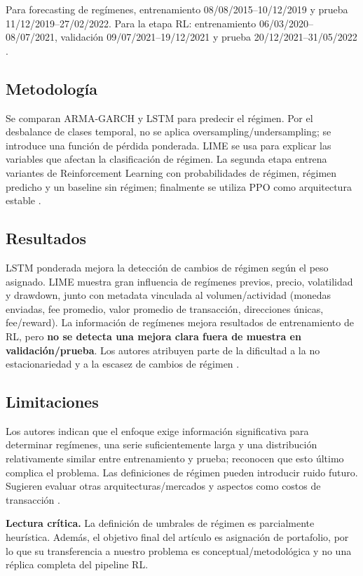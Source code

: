 \documentclass[11pt,letterpaper]{article}
\newcommand{\critica}[1]{\par\smallskip\noindent\textbf{Lectura crítica.} #1}
\begin{document}
Para forecasting de regímenes, entrenamiento 08/08/2015--10/12/2019 y prueba 11/12/2019--27/02/2022. Para la etapa RL: entrenamiento 06/03/2020--08/07/2021, validación 09/07/2021--19/12/2021 y prueba 20/12/2021--31/05/2022 \parencite{agakishiev2025}.

\subsection{Metodología}
Se comparan ARMA-GARCH y LSTM para predecir el régimen. Por el desbalance de clases temporal, no se aplica oversampling/undersampling; se introduce una función de pérdida ponderada. LIME se usa para explicar las variables que afectan la clasificación de régimen. La segunda etapa entrena variantes de Reinforcement Learning con probabilidades de régimen, régimen predicho y un baseline sin régimen; finalmente se utiliza PPO como arquitectura estable \parencite{agakishiev2025}.

\subsection{Resultados}
LSTM ponderada mejora la detección de cambios de régimen según el peso asignado. LIME muestra gran influencia de regímenes previos, precio, volatilidad y drawdown, junto con metadata vinculada al volumen/actividad (monedas enviadas, fee promedio, valor promedio de transacción, direcciones únicas, fee/reward). La información de regímenes mejora resultados de entrenamiento de RL, pero \textbf{no se detecta una mejora clara fuera de muestra en validación/prueba}. Los autores atribuyen parte de la dificultad a la no estacionariedad y a la escasez de cambios de régimen \parencite{agakishiev2025}.

\subsection{Limitaciones}
Los autores indican que el enfoque exige información significativa para determinar regímenes, una serie suficientemente larga y una distribución relativamente similar entre entrenamiento y prueba; reconocen que esto último complica el problema. Las definiciones de régimen pueden introducir ruido futuro. Sugieren evaluar otras arquitecturas/mercados y aspectos como costos de transacción \parencite{agakishiev2025}.

\critica{La definición de umbrales de régimen es parcialmente heurística. Además, el objetivo final del artículo es asignación de portafolio, por lo que su transferencia a nuestro problema es conceptual/metodológica y no una réplica completa del pipeline RL.}
\end{document}

